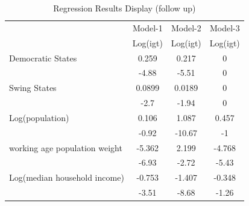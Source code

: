 \begin{table}[htbp]
  \centering
  \caption{Regression Results Display (follow up)}
  \begin{tabular}{p{6.93em}ccc}
    \toprule
    \multicolumn{1}{c}{}          & \multicolumn{1}{p{7.645em}}{Model-1}  & \multicolumn{1}{p{7.5em}}{Model-2}  & \multicolumn{1}{p{8.07em}}{Model-3}  \\
    \multicolumn{1}{c}{}          & \multicolumn{1}{p{7.645em}}{Log(igt)} & \multicolumn{1}{p{7.5em}}{Log(igt)} & \multicolumn{1}{p{8.07em}}{Log(igt)} \\
    \midrule
    Democratic States             & 0.259                                 & 0.217                               & 0                                    \\
    \multicolumn{1}{c}{}          & -4.88                                 & -5.51                               & 0                                    \\
    Swing States                  & 0.0899                                & 0.0189                              & 0                                    \\
    \multicolumn{1}{c}{}          & -2.7                                  & -1.94                               & 0                                    \\
    Log(population)               & 0.106                                 & 1.087                               & 0.457                                \\
    \multicolumn{1}{c}{}          & -0.92                                 & -10.67                              & -1                                   \\
    working age population weight & -5.362                                & 2.199                               & -4.768                               \\
    \multicolumn{1}{c}{}          & -6.93                                 & -2.72                               & -5.43                                \\
    Log(median household income)  & -0.753                                & -1.407                              & -0.348                               \\
    \multicolumn{1}{c}{}          & -3.51                                 & -8.68                               & -1.26                                \\

\end{tabular}
\end{table}
